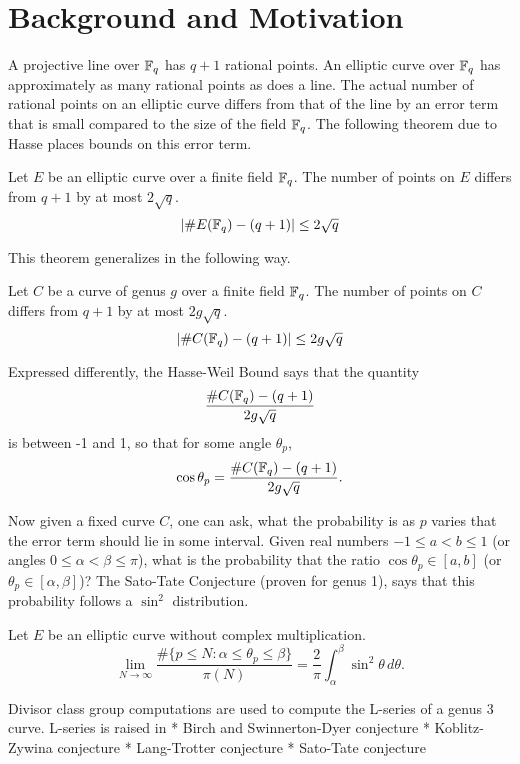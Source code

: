 

\section{Background and Motivation}


A projective line over $\mathbb{F}_q$ has $q + 1$ rational points.
An elliptic curve over $\mathbb{F}_q$ has approximately as many rational points as does a line.
The actual number of rational points on an elliptic curve differs from that of the line by an error term
that is small compared to the size of the field $\mathbb{F}_q$.
The following theorem due to Hasse places bounds on this error term.
\begin{theorem}
  Let $E$ be an elliptic curve over a finite field $\mathbb{F}_q$.
  The number of points on $E$ differs from $q + 1$ by at most $2 \sqrt q$.
  \[ | \#E(\mathbb{F}_q) - (q + 1) | \leq 2 \sqrt q \]
\end{theorem}

This theorem generalizes in the following way.
\begin{theorem}
  Let $C$ be a curve of genus $g$ over a finite field $\mathbb{F}_q$.
  The number of points on $C$ differs from $q + 1$ by at most $2 g \sqrt q$.
  \[ | \#C(\mathbb{F}_q) - (q + 1) | \leq 2 g \sqrt q \]
\end{theorem}

Expressed differently, the Hasse-Weil Bound says that the quantity
\begin{equation}
  \frac {\#C(\mathbb{F}_q) - (q + 1)}{2 g \sqrt q}
\end{equation}
is between -1 and 1, so that for some angle $\theta_p$,
\begin{equation}
  \label{eq_sato_tate_ratio}
 \cos \theta_p = \frac {\#C(\mathbb{F}_q) - (q + 1)}{2 g \sqrt q}.
\end{equation}

Now given a fixed curve $C$, one can ask, what the probability is as $p$ varies that the error term should lie in some interval.
Given real numbers $-1 \leq a < b \leq 1$ (or angles $0 \leq \alpha < \beta \leq \pi$),
what is the probability that the ratio $\cos \theta_p \in [a, b]$ (or $\theta_p \in [\alpha, \beta]$)?
The Sato-Tate Conjecture (proven for genus 1), says that this probability follows a $\sin^2$ distribution.

\begin{conjecture}
  Let $E$ be an elliptic curve without complex multiplication.
  \[ \lim_{N \to \infty} \frac {\#\{ p \leq N : \alpha \leq \theta_p \leq \beta \}} {\pi(N)} = \frac 2 \pi \int_{\alpha}^{\beta} \sin^2 \theta\,d\theta. \]
\end{conjecture}

Divisor class group computations are used to compute the L-series of a genus 3 curve.
L-series is raised in
  * Birch and Swinnerton-Dyer conjecture
  * Koblitz-Zywina conjecture
  * Lang-Trotter conjecture
  * Sato-Tate conjecture
